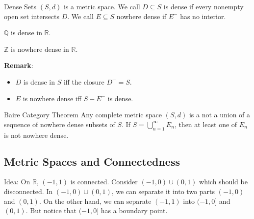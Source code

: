\documentclass{report}
\begin{document}
\begin{definition}{Dense Sets}
    $(S, d)$ is a metric space. We call $D \subseteq S$ is dense if every nonempty open set intersects $D$. We call $E \subseteq S$ nowhere dense if $E^{-}$ has no interior.
\end{definition}

\begin{examples}
    \begin{example}
        $\mathbb{Q}$ is dense in $\mathbb{R}$.
    \end{example}
    \begin{example}
        $\mathbb{Z}$ is nowhere dense in $\mathbb{R}$.
    \end{example}
\end{examples}

\textbf{Remark}:
    \begin{itemize}
        \item  $D$ is dense in $S$ iff the closure $D^{-} = S$.

        \item  $E$ is nowhere dense iff $S - E^{-}$ is dense.
    \end{itemize}

\begin{theorem}{Baire Category Theorem}
    Any complete metric space $(S, d)$ is a not a union of a sequence of nowhere dense subsets of $S$. If $S = \bigcup_{n = 1}^{\infty } E_{n}$, then at least one of $E_{n}$ is not nowhere dense.
\end{theorem}

\begin{topic}
    \section{Metric Spaces and Connectedness}
\end{topic}

Idea: On $\mathbb{R}$, $(-1, 1)$ is connected. Consider $(-1, 0) \cup (0, 1)$ which should be disconnected. In $(-1, 0) \cup (0, 1)$, we can separate it into two parts $(-1, 0)$ and $(0, 1)$. On the other hand, we can separate $(-1, 1)$ into $(-1, 0]$ and $(0, 1)$. But notice that $(-1, 0]$ has a boundary point.
\end{document}
